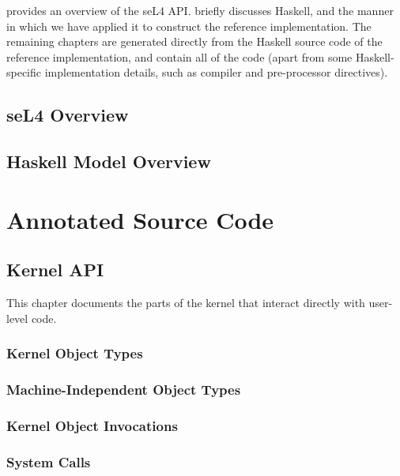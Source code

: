 \documentclass{ertos-book}
\begin{document}
 provides an overview of the seL4 API.  briefly discusses Haskell, and the manner in which we have applied it to construct the reference implementation. The remaining chapters are generated directly from the Haskell source code of the reference implementation, and contain all of the code (apart from some Haskell-specific implementation details, such as compiler and pre-processor directives).

\chapter[overview]{seL4 Overview}


\chapter[haskell]{Haskell Model Overview}


\part{Annotated Source Code}

\chapter[api]{Kernel API}

This chapter documents the parts of the kernel that interact directly with user-level code.

\section[types]{Kernel Object Types}


\section[types.universal]{Machine-Independent Object Types}


\section[invocation]{Kernel Object Invocations}


\section[syscall]{System Calls}

\end{document}
